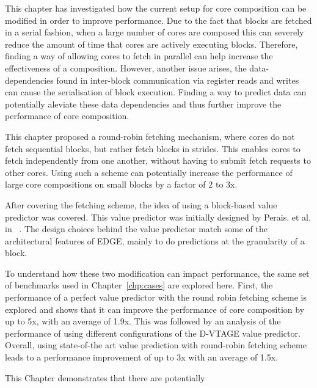 This chapter has investigated how the current setup for core composition can be modified in order to improve performance.
Due to the fact that blocks are fetched in a serial fashion, when a large number of cores are composed this can severely reduce the amount of time that cores are actively executing blocks.
Therefore, finding a way of allowing cores to fetch in parallel can help increase the effectiveness of a composition.
However, another issue arises, the data-dependencies found in inter-block communication via register reads and writes can cause the serialisation of block execution.
Finding a way to predict data can potentially aleviate these data dependencies and thus further improve the performance of core composition.

This chapter proposed a round-robin fetching mechanism, where cores do not fetch sequential blocks, but rather fetch blocks in strides.
This enables cores to fetch independently from one another, without having to submit fetch requests to other cores.
Using such a scheme can potentially increase the performance of large core compositions on small blocks by a factor of 2 to 3x.

After covering the fetching scheme, the idea of using a block-based value predictor was covered.
This value predictor was initially designed by Perais. et al. in ~\cite{}.
The design choices behind the value predictor match some of the architectural features of EDGE, mainly to do predictions at the granularity of a block.

To understand how these two modification can impact performance, the same set of benchmarks used in Chapter~\ref{chp:cases} are explored here.
First, the performance of a perfect value predictor with the round robin fetching scheme is explored and shows that it can improve the performance of core composition by up to 5x, with an average of 1.9x.
This was followed by an analysis of the performance of using different configurations of the D-VTAGE value predictor.
Overall, using state-of-the art value prediction with round-robin fetching scheme leads to a performance improvement of up to 3x with an average of 1.5x.

This Chapter demonstrates that there are potentially 